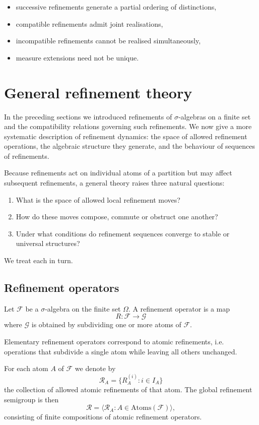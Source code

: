 \documentclass[
 amsmath,amssymb,
  onecolumn %
]{revtex4-2}
\begin{document}
\begin{itemize}[leftmargin=2em]
\item successive refinements generate a partial ordering of distinctions,
\item compatible refinements admit joint realisations,
\item incompatible refinements cannot be realised simultaneously,
\item measure extensions need not be unique.
\end{itemize}


\section{General refinement theory}\label{sec7}

In the preceding sections we introduced refinements of $\sigma$-algebras
on a finite set and the compatibility relations governing such
refinements. We now give a more systematic description of refinement
dynamics: the space of allowed refinement operations, the algebraic
structure they generate, and the behaviour of sequences of refinements.

Because refinements act on individual atoms of a partition but may
affect subsequent refinements, a general theory raises three natural
questions:
\begin{enumerate}
\item	What is the space of allowed local refinement moves?
\item	How do these moves compose, commute or obstruct one another?
\item	Under what conditions do refinement sequences converge to stable or universal structures?
\end{enumerate}
We treat each in turn.

\subsection{Refinement operators}

Let $\mathcal F$ be a $\sigma$-algebra on the finite set $\Omega$.
A refinement operator is a map
\[
R : \mathcal F \longrightarrow \mathcal G
\]
where $\mathcal G$ is obtained by subdividing one or more atoms of
$\mathcal F$.

Elementary refinement operators correspond to atomic refinements,
i.e. operations that subdivide a single atom while leaving all others
unchanged.

For each atom $A$ of $\mathcal F$ we denote by
\[
\mathcal R_A = \{ R_A^{(i)} : i\in I_A \}
\]
the collection of allowed atomic refinements of that atom.
The global refinement semigroup is then
\[
\mathcal R = \langle \mathcal R_A : A\in\mathrm{Atoms}(\mathcal F) \rangle,
\]
consisting of finite compositions of atomic refinement operators.
\end{document}

